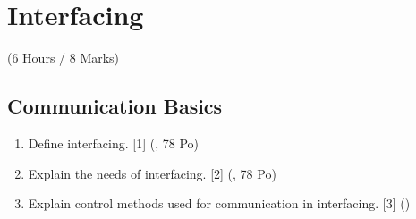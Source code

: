 \documentclass[12pt]{article}
\begin{document}
\pagebreak

\section{Interfacing}
  \begin{center}(6 Hours / 8 Marks)\end{center}
  
  \subsection{Communication Basics}
    \begin{enumerate}
      \item Define interfacing. \hfill [1] (, 78 Po)

      \item Explain the needs of interfacing. \hfill [2] (, 78 Po)

      \item Explain control methods used for communication in interfacing. \hfill [3] ()

    \end{enumerate}
\end{document}
